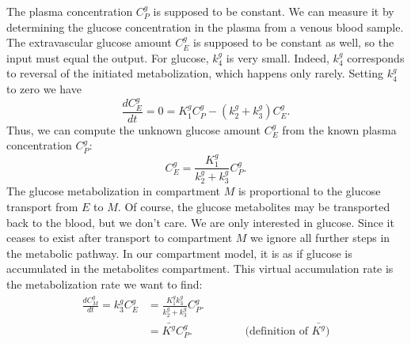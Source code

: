 \documentclass[11pt,oneside]{article}
\begin{document}
The plasma concentration $C_P^g$ is supposed to be constant. We can
measure it by determining the glucose concentration in the plasma from
a venous blood sample. The extravascular glucose amount $C_E^g$ is
supposed to be constant as well, so the input must equal the
output. For glucose, $k_4^g$ is very small. Indeed, $k_4^g$
corresponds to reversal of the initiated metabolization, which happens
only rarely. Setting $k_4^g$ to zero we have
\begin{equation}
\frac{d C_E^g}{dt} = 0 = K_1^g C_P^g - (k_2^g + k_3^g) C_E^g.
\end{equation}
Thus, we can compute the unknown glucose amount $C_E^g$ from the known plasma
concentration $C_P^g$:
\begin{equation}
  C_E^g = \frac{K_1^g}{k_2^g + k_3^g} C_P^g.
\end{equation}
The glucose metabolization in compartment $M$ is proportional to the glucose
transport from $E$ to $M$. Of course, the glucose metabolites may be
transported back to the blood, but we don't care. We are only interested in
glucose. Since it ceases to exist after transport to compartment $M$ we ignore
all further steps in the metabolic pathway. In our compartment model, it is as
if glucose is accumulated in the metabolites compartment. This virtual
accumulation rate is the metabolization rate we want to find:
\begin{align}
  \frac{d C_M^g}{d t} = k_3^g C_E^g &= 
   \frac{K_1^g k_3^g}{k_2^g + k_3^g} C_P^g.\\
  &= \bar{K^g}  C_P^g. \hspace{2cm} \mbox{$($definition of } \bar{K^g})
\end{align}
\end{document}
